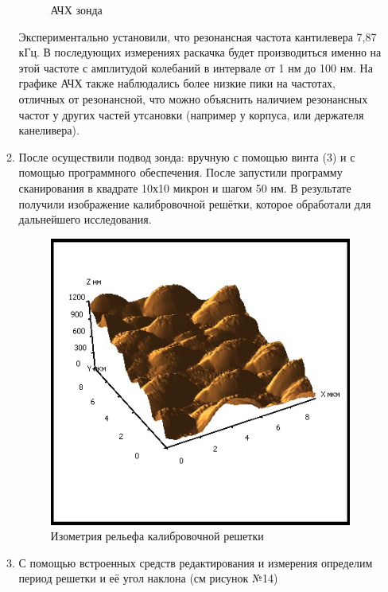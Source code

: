 \documentclass[a4paper,12pt]{article}
\theoremstyle{plain} %
\theoremstyle{definition} %
\theoremstyle{remark} %
\begin{document}
\begin{itemize}
\begin{enumerate}
\begin{figure}[h!]
		\caption{АЧХ зонда}
		\label{pic13}
	\end{figure}
	Экспериментально установили, что резонансная частота кантилевера 7,87 кГц. В последующих измерениях раскачка будет производиться именно на этой частоте с амплитудой колебаний в интервале от 1 нм до 100 нм. На графике АЧХ также наблюдались более низкие пики на частотах, отличных от резонансной, что можно объяснить наличием резонансных частот у других частей утсановки (например у корпуса, или держателя канеливера).
	\item
	После осуществили подвод зонда: вручную с помощью винта (3) и с помощью программного обеспечения. После запустили программу сканирования в квадрате 10х10 микрон и шагом 50 нм. В результате получили изображение калибровочной решётки, которое обработали для дальнейшего исследования.
	\begin{figure}[h!]
		\centering
		\includegraphics[scale=0.9]{pic100.jpg}
		\caption{Изометрия рельефа калибровочной решетки}
		\label{pic100}
	\end{figure}
	\item
	С помощью встроенных средств редактирования и измерения определим период решетки и её угол наклона (см рисунок №14)


\end{enumerate}
\end{itemize}
\end{document}
